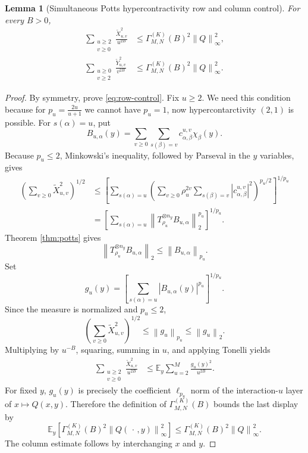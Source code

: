 \documentclass[11pt]{article}
\newtheorem{lemma}[theorem]{Lemma}
\theoremstyle{definition}
\theoremstyle{remark}
\newcommand{\E}{\mathbb{E}}
\newcommand{\norm}[1]{\left\lVert #1\right\rVert}
\newcommand{\abs}[1]{\left\lvert #1\right\rvert}
\begin{document}
\begin{lemma}[Simultaneous Potts hypercontractivity row and column control]
\label{lem:row-column}
For every $B>0$,
\begin{align}
 \sum_{\substack{u\ge2\\v\ge0}}
 \frac{\widetilde X_{u,v}^2}{u^{2B}}
 &\le
 \Gamma^{(K)}_{M,N}(B)^2\norm Q_\infty^2,
 \label{eq:row-control}\\
 \sum_{\substack{u\ge0\\v\ge2}}
 \frac{\widetilde Y_{u,v}^2}{v^{2B}}
 &\le
 \Gamma^{(K)}_{M,N}(B)^2\norm Q_\infty^2.
 \label{eq:column-control}
\end{align}
\end{lemma}

\begin{proof}
By symmetry, prove \eqref{eq:row-control}.  Fix $u\ge2$.  We need this condition because for $p_u=\frac{2u}{u+1}$ we cannot have $p_u=1$, now hypercontarctivity $(2,1)$ is possible.
For
$s(\alpha)=u$, put
\begin{equation}
\label{eq:Bualpha}
 B_{u,\alpha}(y)
 =\sum_{v\ge0}\sum_{s(\beta)=v}
 c^{u,v}_{\alpha,\beta}\chi_\beta(y).
\end{equation}
Because $p_u\le2$, Minkowski's inequality, followed by Parseval in the
$y$ variables, gives
\begin{align*}
 \left(\sum_{v\ge0}\widetilde X_{u,v}^2\right)^{1/2}
 &\le
 \left[
  \sum_{s(\alpha)=u}
  \left(
   \sum_{v\ge0}\rho_u^{2v}
   \sum_{s(\beta)=v}\abs{c^{u,v}_{\alpha,\beta}}^2
  \right)^{p_u/2}
 \right]^{1/p_u}\\
 &=\left[
  \sum_{s(\alpha)=u}
  \norm{T_{\rho_u}^{\otimes n_y}B_{u,\alpha}}_2^{p_u}
 \right]^{1/p_u}.
\end{align*}
Theorem \ref{thm:potts} gives
\[
 \norm{T_{\rho_u}^{\otimes n_y}B_{u,\alpha}}_2
 \le\norm{B_{u,\alpha}}_{p_u}.
\]
Set
\[
 g_u(y)=
 \left[
  \sum_{s(\alpha)=u}
  \abs{B_{u,\alpha}(y)}^{p_u}
 \right]^{1/p_u}.
\]
Since the measure is normalized and $p_u\le2$,
\begin{equation}
\label{eq:fixed-u}
 \left(\sum_{v\ge0}\widetilde X_{u,v}^2\right)^{1/2}
 \le\norm{g_u}_{p_u}\le\norm{g_u}_2.
\end{equation}
Multiplying by $u^{-B}$, squaring, summing in $u$, and applying Tonelli yields
\begin{align*}
 \sum_{\substack{u\ge2\\v\ge0}}
 \frac{\widetilde X_{u,v}^2}{u^{2B}}
 &\le
 \E_y\sum_{u=2}^M\frac{g_u(y)^2}{u^{2B}}.
\end{align*}
For fixed $y$, $g_u(y)$ is precisely the coefficient $\ell_{p_u}$ norm of
the interaction-$u$ layer of $x\mapsto Q(x,y)$.  Therefore the definition
of $\Gamma^{(K)}_{M,N}(B)$ bounds the last display by
\[
 \E_y\left[
  \Gamma^{(K)}_{M,N}(B)^2
  \norm{Q(\,\cdot\,,y)}_\infty^2
 \right]
 \le\Gamma^{(K)}_{M,N}(B)^2\norm Q_\infty^2.
\]
The column estimate follows by interchanging $x$ and $y$.
\end{proof}
\end{document}
